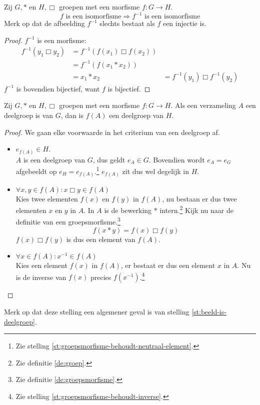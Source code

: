 \documentclass[main.tex]{subfiles}
\begin{document}
\begin{st}
  Zij $G,*$ en $H,\Box$ groepen met een morfisme $f: G \rightarrow H$.
  \[ f \text{ is een isomorfisme} \Rightarrow f^{-1} \text{ is een isomorfisme} \]
  Merk op dat de afbeelding $f^{-1}$ slechts bestaat als $f$ een injectie is.
  \begin{proof}
    $f^{-1}$ is een morfisme:
    \[ 
    \begin{array}{rll}
      f^{-1}(y_{1} \Box y_{2}) &= f^{-1}(f(x_{1}) \Box f(x_{2})) &\\
                             &= f^{-1}(f(x_{1} * x_{2})) &\\
                             &= x_{1} * x_{2} &= f^{-1}(y_{1}) \Box f^{-1}(y_{2})
    \end{array}
    \]
    $f^{-1}$ is bovendien bijectief, want $f$ is bijectief.
  \end{proof}
\end{st}

\begin{st}
  Zij $G,*$ en $H,\Box$ groepen met een morfisme $f: G \rightarrow H$.
  Als een verzameling $A$ een deelgroep is van $G$, dan is $f(A)$ een deelgroep van $H$.

  \begin{proof}
    We gaan elke voorwaarde in het criterium van een deelgroep af.
    \begin{itemize}
    \item $e_{f(A)} \in H$.\\
      $A$ is een deelgroep van $G$, dus geldt $e_{A}\in G$.
      Bovendien wordt $e_{A} = e_{G}$ afgebeeldt op $e_{H} = e_{f(A)}$.\footnote{Zie stelling \ref{st:groepsmorfisme-behoudt-neutraal-element}.}
      $e_{f(A)}$ zit dus wel degelijk in $H$.
    \item $\forall x,y \in f(A): x \Box y \in f(A)$\\
      Kies twee elementen $f(x)$ en $f(y)$ in $f(A)$, nu bestaan er dus twee elementen $x$ en $y$ in $A$.
      In $A$ is de bewerking $*$ intern.\footnote{Zie definitie \ref{de:groep}.}
      Kijk nu naar de definitie van een groepsmorfisme.\footnote{Zie definitie \ref{de:groepsmorfisme}.}
      \[ f(x * y) = f(x) \Box f(y) \]
      $f(x) \Box f(y)$ is dus een element van $f(A)$.
    \item $\forall x \in f(A): x^{-1} \in f(A)$\\
      Kies een element $f(x)$ in $f(A)$, er bestaat er dus een element $x$ in $A$.
      Nu is de inverse van $f(x)$ precies $f(x^{-1})$.\footnote{Zie stelling \ref{st:groepsmorfisme-behoudt-inverse}.}
    \end{itemize}
  \end{proof}
  Merk op dat deze stelling een algemener geval is van stelling \ref{st:beeld-is-deelgroep}.
\end{st}
\end{document}

